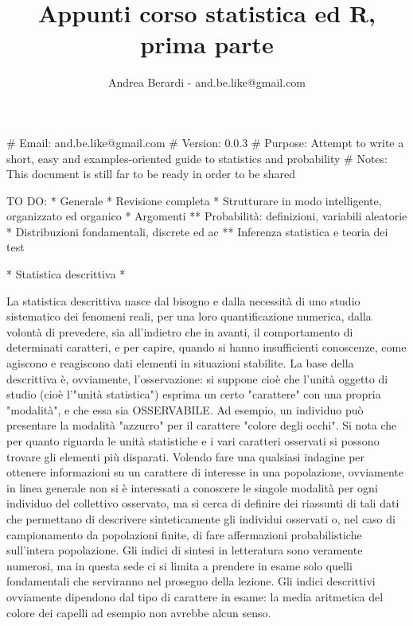 \documentclass{book}
\title{Appunti corso statistica ed R, prima parte}
\author{Andrea Berardi - and.be.like@gmail.com}
\begin{document}
# Email:	and.be.like@gmail.com
# Version:	0.0.3
# Purpose:	Attempt to write a short, easy and examples-oriented guide to statistics and probability
# Notes:	This document is still far to be ready in order to be shared

\maketitle

TO DO:
* Generale
	* Revisione completa
	* Strutturare in modo intelligente, organizzato ed organico
* Argomenti
	** Probabilità: definizioni, variabili aleatorie
	* Distribuzioni fondamentali, discrete ed ac
	** Inferenza statistica e teoria dei test




				* Statistica descrittiva *

La statistica descrittiva nasce dal bisogno e dalla necessità di uno studio sistematico dei fenomeni reali, per una loro quantificazione numerica, dalla volontà di prevedere, sia all'indietro che in avanti, il comportamento di determinati caratteri, e per capire, quando si hanno insufficienti conoscenze, come agiscono e reagiscono dati elementi in situazioni stabilite.
La base della descrittiva è, ovviamente, l'osservazione: si suppone cioè che l'unità oggetto di studio (cioè l'"unità statistica") esprima un certo "carattere" con una propria "modalità", e che essa sia OSSERVABILE.
Ad esempio, un individuo può presentare la modalità "azzurro" per il carattere "colore degli occhi". Si nota che per quanto riguarda le unità statistiche e i vari caratteri osservati si possono trovare gli elementi più disparati.
Volendo fare una qualsiasi indagine per ottenere informazioni su un carattere di interesse in una popolazione, ovviamente in linea generale non si è interessati a conoscere le singole modalità per ogni individuo del collettivo osservato, ma si cerca di definire dei riassunti di tali dati che permettano di descrivere sinteticamente gli individui osservati o, nel caso di campionamento da popolazioni finite, di fare affermazioni probabilistiche sull'intera popolazione.
Gli indici di sintesi in letteratura sono veramente numerosi, ma in questa sede ci si limita a prendere in esame solo quelli fondamentali che serviranno nel proseguo della lezione.
Gli indici descrittivi ovviamente dipendono dal tipo di carattere in esame: la media aritmetica del colore dei capelli ad esempio non avrebbe alcun senso.
\end{document}
